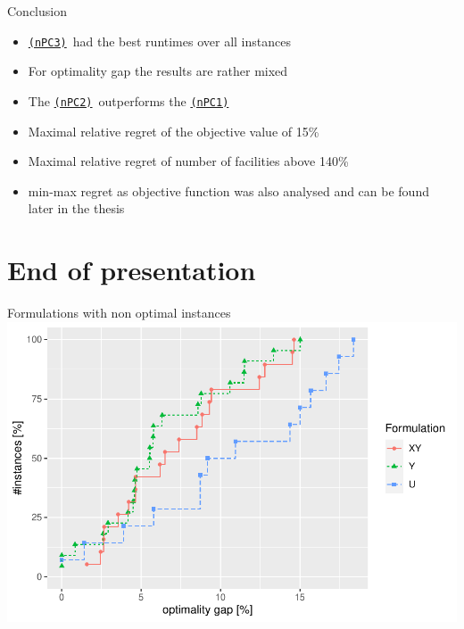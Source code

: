 \documentclass[utf8,aspectratio=169,ngerman,english]{beamer}
\newcommand{\nPC}{\hyperref[eq:nPC]{\texttt{(nPC1)}}}
\newcommand{\nPCE}{\hyperref[eq:nPCE]{\texttt{(nPC3)}}}
\newcommand{\nPCY}{\hyperref[eq:nPCY]{\texttt{(nPC2)}}}
\begin{document}
\begin{frame}{Conclusion}
    \begin{itemize}
        \item \nPCE\ had the best runtimes over all instances
        \item For optimality gap the results are rather mixed
        \item The \nPCY\ outperforms the \nPC
        \item Maximal relative regret of the objective value of 15\%
        \item Maximal relative regret of number of facilities above 140\%
        \item min-max regret as objective function was also analysed and can be found later in the thesis
    \end{itemize}
\end{frame}


\maketitle

\section*{End of presentation}

\begin{frame}{Formulations with non optimal instances}
    \centering
    \includegraphics[width = .65\linewidth, keepaspectratio]{images/gap_models_sH_nopt.pdf}
\end{frame}
\end{document}
